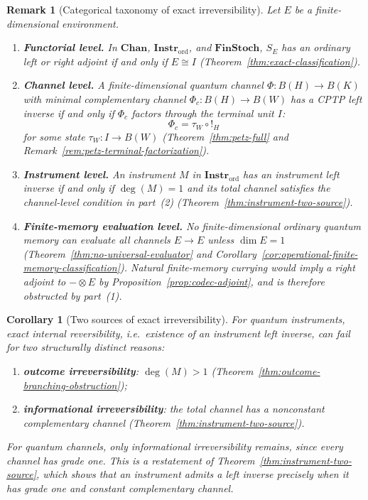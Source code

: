 \documentclass[11pt]{article}
\newtheorem{corollary}[theorem]{Corollary}
\newtheorem{remark}[theorem]{Remark}
\begin{document}
\begin{remark}[Categorical taxonomy of exact irreversibility]
\label{rem:irreversibility-taxonomy}
Let $E$ be a finite-dimensional environment.
\begin{enumerate}
\item \textbf{Functorial level.}
In $\mathbf{Chan}$, $\mathbf{Instr}_{\mathrm{ord}}$, and
$\mathbf{FinStoch}$, $S_E$ has an ordinary left or right adjoint if and
only if $E\cong I$ (Theorem~\ref{thm:exact-classification}).

\item \textbf{Channel level.}
A finite-dimensional quantum channel $\Phi:B(H)\to B(K)$ with minimal
complementary channel $\Phi_c:B(H)\to B(W)$ has a CPTP left inverse if and
only if $\Phi_c$ factors through the terminal unit $I$:
\[
\Phi_c=\tau_W\circ !_H
\]
for some state $\tau_W:I\to B(W)$
(Theorem~\ref{thm:petz-full} and
Remark~\ref{rem:petz-terminal-factorization}).

\item \textbf{Instrument level.}
An instrument $M$ in $\mathbf{Instr}_{\mathrm{ord}}$ has an instrument left
inverse if and only if $\deg(M)=1$ and its total channel satisfies the
channel-level condition in part~(2)
(Theorem~\ref{thm:instrument-two-source}).

\item \textbf{Finite-memory evaluation level.}
No finite-dimensional ordinary quantum memory can evaluate all channels
$E\to E$ unless $\dim E=1$
(Theorem~\ref{thm:no-universal-evaluator} and
Corollary~\ref{cor:operational-finite-memory-classification}). Natural
finite-memory currying would imply a right adjoint to $-\otimes E$ by
Proposition~\ref{prop:codec-adjoint}, and is therefore obstructed by
part~(1).
\end{enumerate}
\end{remark}

\begin{corollary}[Two sources of exact irreversibility]
\label{cor:two-sources}
For quantum instruments, exact internal reversibility, i.e.\ existence of
an instrument left inverse, can fail for two structurally distinct reasons:
\begin{enumerate}
\item \textbf{outcome irreversibility}: $\deg(M)>1$
(Theorem~\ref{thm:outcome-branching-obstruction});
\item \textbf{informational irreversibility}: the total channel has a
nonconstant complementary channel (Theorem~\ref{thm:instrument-two-source}).
\end{enumerate}
For quantum channels, only informational irreversibility remains, since every
channel has grade one. This is a restatement of
Theorem~\ref{thm:instrument-two-source}, which shows that an instrument admits a
left inverse precisely when it has grade one and constant complementary channel.
\end{corollary}
\end{document}
